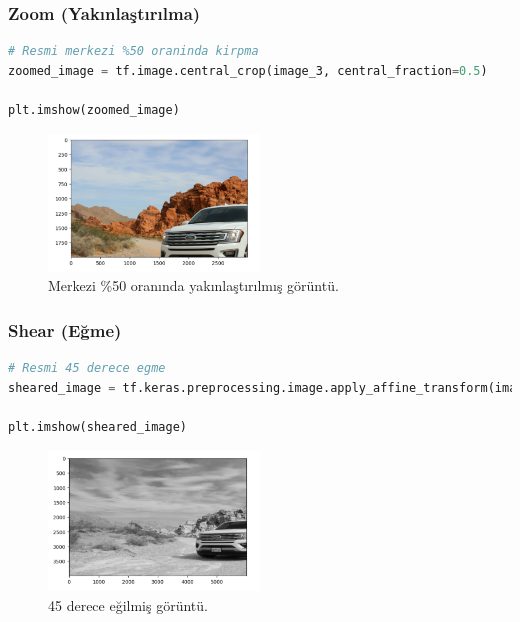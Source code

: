 \subsubsection{Zoom (Yakınlaştırılma)}

\begin{lstlisting}[language=Python]
# Resmi merkezi %50 oraninda kirpma
zoomed_image = tf.image.central_crop(image_3, central_fraction=0.5)

plt.imshow(zoomed_image)
\end{lstlisting}

\begin{figure}[h]
    \centering
    \includegraphics[width=0.5\textwidth]{images/image_aug_11.png}
    \caption{Merkezi \%50 oranında yakınlaştırılmış görüntü.}
    \label{fig:enter-label}
\end{figure}

\newpage

\subsubsection{Shear (Eğme)}

\begin{lstlisting}[language=Python]
# Resmi 45 derece egme
sheared_image = tf.keras.preprocessing.image.apply_affine_transform(image_3, shear=45)

plt.imshow(sheared_image)
\end{lstlisting}

\begin{figure}[h]
    \centering
    \includegraphics[width=0.5\textwidth]{images/image_aug_12.png}
    \caption{45 derece eğilmiş görüntü.}
    \label{fig:enter-label}
\end{figure}

